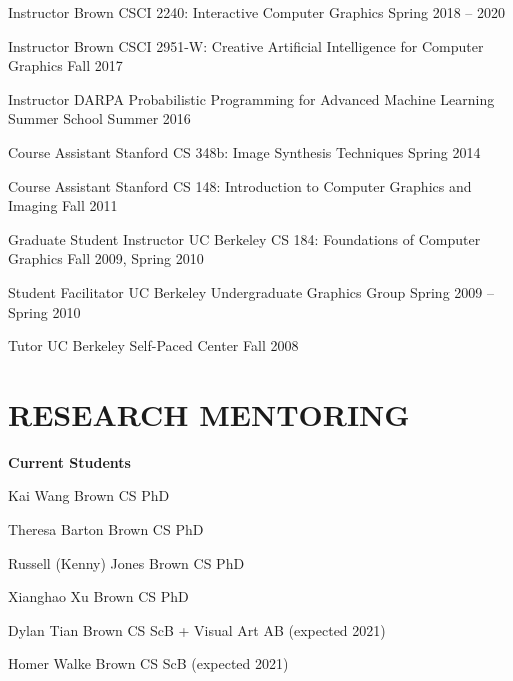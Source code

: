 \documentclass[line,margin]{res}
\begin{document}
\begin{resume}
\teach
{Instructor}
{Brown CSCI 2240: Interactive Computer Graphics}
{Spring 2018 -- 2020}

\teach
{Instructor}
{Brown CSCI 2951-W: Creative Artificial Intelligence for Computer Graphics}
{Fall 2017}

\teach
{Instructor}
{DARPA Probabilistic Programming for Advanced Machine Learning Summer School}
{Summer 2016}

\teach
{Course Assistant}
{Stanford CS 348b: Image Synthesis Techniques}
{Spring 2014}

\teach
{Course Assistant}
{Stanford CS 148: Introduction to Computer Graphics and Imaging}
{Fall 2011}

\teach
{Graduate Student Instructor}
{UC Berkeley CS 184: Foundations of Computer Graphics}
{Fall 2009, Spring 2010}

\teach
{Student Facilitator}
{UC Berkeley Undergraduate Graphics Group}
{Spring 2009 -- Spring 2010}

\teach
{Tutor}
{UC Berkeley Self-Paced Center}
{Fall 2008}


\section{RESEARCH MENTORING}

\newcommand{\currentphd}[2] {
	#1 \hfill #2
}

\newcommand{\student}[3] {
	#1 \hfill #2 (expected #3)
}

\newcommand{\alumni}[4] {
	#1 \hfill #2 #3\\
	\emph{Next position: #4}
}

\newcommand{\visitor}[4] {
	#1 \hfill #2 #3\\
	\emph{Home institution: #4}
}


\textbf{Current Students}

\currentphd
{Kai Wang}
{Brown CS PhD}

\currentphd
{Theresa Barton}
{Brown CS PhD}

\currentphd
{Russell (Kenny) Jones}
{Brown CS PhD}

\currentphd
{Xianghao Xu}
{Brown CS PhD}

\student
{Dylan Tian}
{Brown CS ScB + Visual Art AB}
{2021}

\student
{Homer Walke}
{Brown CS ScB}
{2021}


\end{resume}
\end{document}
